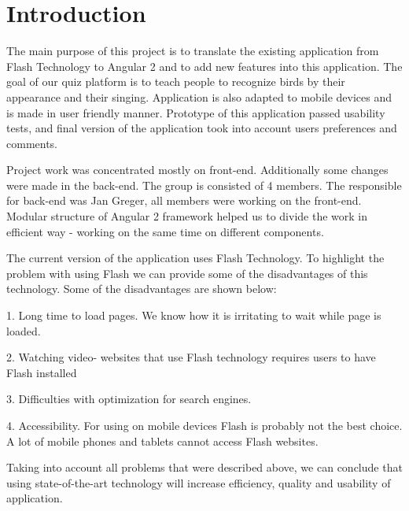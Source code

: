 
\chapter{Introduction}
\label{chap:introduction}
 
 
\par The main purpose of this project is to translate the existing application from Flash Technology to Angular 2 and to add new features into this application.
The goal of our quiz platform is to teach people to recognize birds by their appearance and their singing. Application is also adapted to mobile devices and is made in user friendly manner. Prototype of this application passed usability tests, and final version of the application took into account users preferences and comments.
\par
Project work was concentrated mostly on front-end. Additionally some changes were made in the back-end. The group is consisted of 4 members. The responsible for back-end  was Jan Greger, all members were working on the front-end. Modular structure of Angular 2 framework helped us to divide the work in efficient way - working on the same time on different components. 
\par
The current version of the application uses Flash Technology. To highlight the problem with using Flash we can provide some of the disadvantages of this technology. \newline
Some of the disadvantages are shown below:
\par
1. Long time to load pages. We know how it is irritating to wait while page is loaded. 
\par
2. Watching video- websites that use Flash technology requires users to have Flash installed
\par
3. Difficulties with optimization for search engines. 
\par
4. Accessibility. For using on mobile devices Flash is probably not the best choice. A lot of mobile phones and tablets cannot access Flash websites.  \cite{Advan78:online}
\par
Taking into account all problems that were described above, we can conclude that using state-of-the-art technology will increase efficiency, quality and usability of application. 
